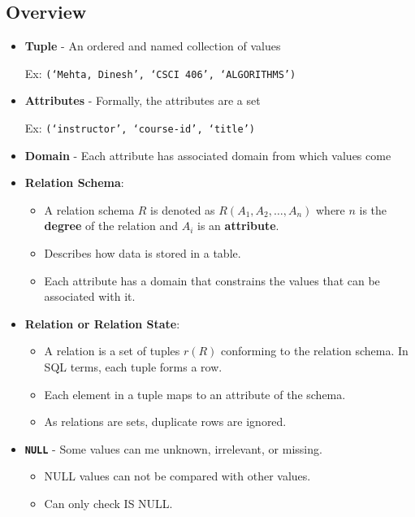 \documentclass{../cheatsheet}
\begin{document}
\begin{multicols*}{2}
    \section{Overview}
    \begin{itemize}
        \item \textbf{Tuple} -
            An ordered and named collection of values

            Ex: \texttt{(`Mehta, Dinesh', `CSCI 406', `ALGORITHMS')}
        \item \textbf{Attributes} -
            Formally, the attributes are a set

            Ex: \texttt{(`instructor', `course-id', `title')}
        \item \textbf{Domain} -
            Each attribute has associated domain from which
            values come
        \item \textbf{Relation Schema}:
            \begin{itemize}
                \item A relation schema $R$ is denoted as $R(A_1,
                    A_2,\dots,A_n)$ where $n$ is the \textbf{degree} of the
                    relation and $A_i$ is an \textbf{attribute}.
                \item Describes how data is stored in a table.
                \item Each attribute has a domain that constrains the values
                    that can be associated with it.
            \end{itemize}

        \item \textbf{Relation or Relation State}:
            \begin{itemize}
                \item A relation is a set of tuples $r(R)$ conforming to the
                    relation schema. In SQL terms, each tuple forms a row.
                \item Each element in a tuple maps to an attribute of the schema.
                \item As relations are sets, duplicate rows are ignored.
            \end{itemize}

        \item \textbf{\texttt{NULL}} -
            Some values can me unknown, irrelevant, or missing.
            \begin{itemize}
                \item NULL values can not be compared with other values.
                \item Can only check IS NULL.
            \end{itemize}


\end{itemize}
\end{multicols*}
\end{document}
